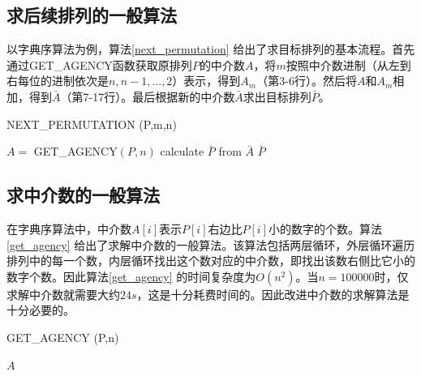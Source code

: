 \documentclass[10pt, twocolumn]{ctexart}
\begin{document}
\subsection{求后续排列的一般算法}
以字典序算法为例，算法\ref{next_permutation} 给出了求目标排列的基本流程。首先通过GET\_AGENCY函数获取原排列$P$的中介数$A$，将$m$按照中介数进制（从左到右每位的进制依次是$n,n-1,...,2$）表示，得到$A_m$（第3-6行）。然后将$A$和$A_m$相加，得到$\bar{A}$（第7-17行）。最后根据新的中介数$\bar{A}$求出目标排列$\bar{P}$。
\begin{algorithm}[!t]
\caption{NEXT\_PERMUTATION (P,m,n)}
\label{next_permutation}
\begin{algorithmic}[1]
\STATE $A=$ GET\_AGENCY$(P,n)$
\ENDFOR
{}
\ELSE
{}
\ENDIF
\ENDFOR
\STATE calculate $\bar{P}$ from $\bar{A}$
\RETURN $\bar{P}$
\end{algorithmic}
\end{algorithm}




\subsection{求中介数的一般算法}
在字典序算法中，中介数$A[i]$表示$P[i]$右边比$P[i]$小的数字的个数。算法\ref{get_agency} 给出了求解中介数的一般算法。该算法包括两层循环，外层循环遍历排列中的每一个数，内层循环找出这个数对应的中介数，即找出该数右侧比它小的数字个数。因此算法\ref{get_agency} 的时间复杂度为$O(n^2)$。当$n=100000$时，仅求解中介数就需要大约$24s$，这是十分耗费时间的。因此改进中介数的求解算法是十分必要的。

\begin{algorithm}
\caption{GET\_AGENCY (P,n)}
\label{get_agency}
\begin{algorithmic}[1]
\ENDIF
\ENDFOR
\ENDFOR
\RETURN $A$
\end{algorithmic}
\end{algorithm}
\fi
\end{document}
